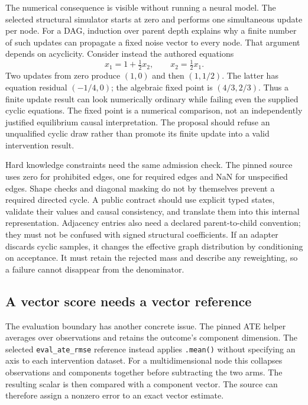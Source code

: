 The numerical consequence is visible without running a neural model.
The selected structural simulator starts at zero and performs one simultaneous
update per node. For a DAG, induction over parent depth explains why a finite
number of such updates can propagate a fixed noise vector to every node.
That argument depends on acyclicity. Consider instead the authored equations
\[
        x_1=1+\tfrac12x_2,\qquad x_2=\tfrac12x_1.
\]
Two updates from zero produce \((1,0)\) and then \((1,1/2)\).
The latter has equation residual \((-1/4,0)\); the algebraic fixed point is
\((4/3,2/3)\). Thus a finite update result can look numerically ordinary while
failing even the supplied cyclic equations. The fixed point is a numerical
comparison, not an independently justified equilibrium causal interpretation.
The proposal should refuse an unqualified cyclic draw rather than promote
its finite update into a valid intervention result.
\citep{exec14_causica_primary,exec14_causica_exact}

Hard knowledge constraints need the same admission check. The pinned source
uses zero for prohibited edges, one for required edges and NaN for unspecified
edges. Shape checks and diagonal masking do not by themselves prevent a
required directed cycle. A public contract should use explicit typed states,
validate their values and causal consistency, and translate them into this
internal representation. Adjacency entries also need a declared
parent-to-child convention; they must not be confused with signed structural
coefficients. If an adapter discards cyclic samples, it changes the effective
graph distribution by conditioning on acceptance. It must retain the rejected
mass and describe any reweighting, so a failure cannot disappear from the
denominator. \citep{exec14_causica_primary,exec14_causica_decision}

\subsection{A vector score needs a vector reference}

The evaluation boundary has another concrete issue. The pinned ATE helper
averages over observations and retains the outcome's component dimension.
The selected \texttt{eval\_ate\_rmse} reference instead applies
\texttt{.mean()} without specifying an axis to each intervention dataset.
For a multidimensional node this collapses observations and components
together before subtracting the two arms. The resulting scalar is then
compared with a component vector. The source can therefore assign a nonzero
error to an exact vector estimate. \citep{exec14_causica_primary}

